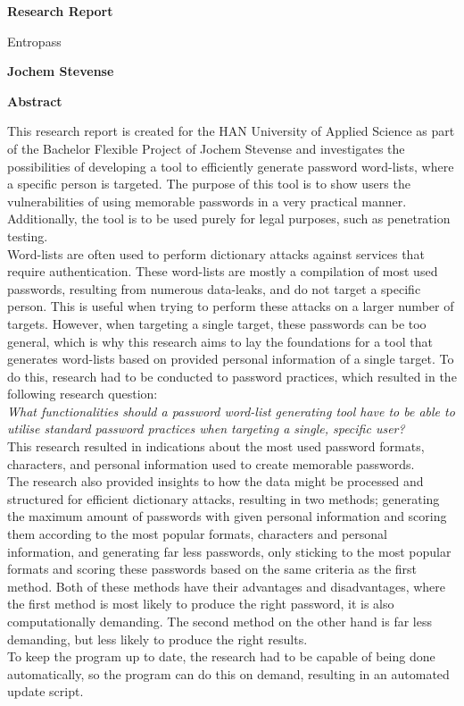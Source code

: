 \documentclass[a4paper,12pt]{article}
\begin{document}
\thispagestyle{plain}
\begin{center}
    \Large
    \textbf{Research Report}
        
    \vspace{0.4cm}
    \large
    Entropass
        
    \vspace{0.4cm}
    \textbf{Jochem Stevense}
       
    \vspace{0.9cm}
    \textbf{Abstract}
\end{center}

This research report is created for the HAN University of Applied Science as part of the Bachelor Flexible Project of Jochem Stevense and investigates the possibilities of developing a tool to efficiently generate password word-lists, where a specific person is targeted. The purpose of this tool is to show users the vulnerabilities of using memorable passwords in a very practical manner. Additionally, the tool is to be used purely for legal purposes, such as penetration testing.\\

Word-lists are often used to perform dictionary attacks against services that require authentication. These word-lists are mostly a compilation of most used passwords, resulting from numerous data-leaks, and do not target a specific person. This is useful when trying to perform these attacks on a larger number of targets. However, when targeting a single target, these passwords can be too general, which is why this research aims to lay the foundations for a tool that generates word-lists based on provided personal information of a single target. To do this, research had to be conducted to password practices, which resulted in the following research question:\\
\textit{What functionalities should a password word-list generating tool have to be able to utilise standard password practices when targeting a single, specific user?}\\
This research resulted in indications about the most used password formats, characters, and personal information used to create memorable passwords.\\
The research also provided insights to how the data might be processed and structured for efficient dictionary attacks, resulting in two methods; generating the maximum amount of passwords with given personal information and scoring them according to the most popular formats, characters and personal information, and generating far less passwords, only sticking to the most popular formats and scoring these passwords based on the same criteria as the first method. Both of these methods have their advantages and disadvantages, where the first method is most likely to produce the right password, it is also computationally demanding. The second method on the other hand is far less demanding, but less likely to produce the right results.\\
To keep the program up to date, the research had to be capable of being done automatically, so the program can do this on demand, resulting in an automated update script.\\
\end{document}
